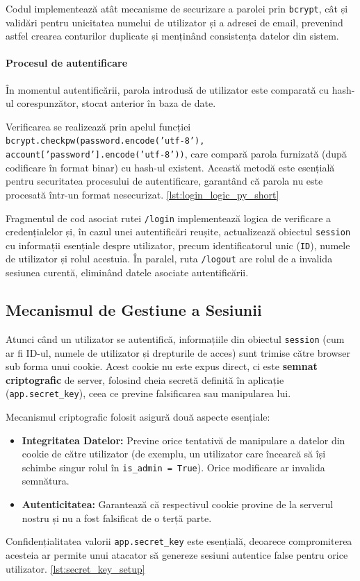 \documentclass[12pt, a4paper, oneside, romanian]{teza-upb}
\begin{document}
Codul implementează atât mecanisme de securizare a parolei prin \texttt{bcrypt}, cât și validări pentru unicitatea numelui de utilizator și a adresei de email, prevenind astfel crearea conturilor duplicate și menținând consistența datelor din sistem.

\paragraph{Procesul de autentificare}
În momentul autentificării, parola introdusă de utilizator este comparată cu hash-ul corespunzător, stocat anterior în baza de date. 

Verificarea se realizează prin apelul funcției \texttt{bcrypt.checkpw(password.encode('utf-8'), account['password'].encode('utf-8'))}, care compară parola furnizată (după codificare în format binar) cu hash-ul existent. Această metodă este esențială pentru securitatea procesului de autentificare, garantând că parola nu este procesată într-un format nesecurizat. \ref{lst:login_logic_py_short}



Fragmentul de cod asociat rutei \texttt{/login} implementează logica de verificare a credențialelor și, în cazul unei autentificări reușite, actualizează obiectul \texttt{session} cu informații esențiale despre utilizator, precum identificatorul unic (\texttt{ID}), numele de utilizator și rolul acestuia. În paralel, ruta \texttt{/logout} are rolul de a invalida sesiunea curentă, eliminând datele asociate autentificării.


\subsection{Mecanismul de Gestiune a Sesiunii}
Atunci când un utilizator se autentifică, informațiile din obiectul \texttt{session} (cum ar fi ID-ul, numele de utilizator și drepturile de acces) sunt trimise către browser sub forma unui cookie. Acest cookie nu este expus direct, ci este \textbf{semnat criptografic} de server, folosind cheia secretă definită în aplicație (\texttt{app.secret\_key}), ceea ce previne falsificarea sau manipularea lui.


Mecanismul criptografic folosit asigură două aspecte esențiale:
\begin{itemize}
	\item \textbf{Integritatea Datelor:} Previne orice tentativă de manipulare a datelor din cookie de către utilizator (de exemplu, un utilizator care încearcă să își schimbe singur rolul în \texttt{is\_admin = True}). Orice modificare ar invalida semnătura.
	\item \textbf{Autenticitatea:} Garantează că respectivul cookie provine de la serverul nostru și nu a fost falsificat de o terță parte.
\end{itemize}
Confidențialitatea valorii \texttt{app.secret\_key} este esențială, deoarece compromiterea acesteia ar permite unui atacator să genereze sesiuni autentice false pentru orice utilizator. \ref{lst:secret_key_setup}
\end{document}
